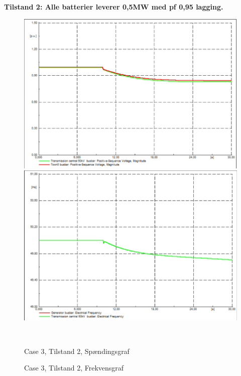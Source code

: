 \textbf{Tilstand 2: Alle batterier leverer 0,5MW med pf 0,95 lagging.}
\begin{figure}[H]
	\centering
	\begin{minipage}[b]{0.48\textwidth}
		\centering
		\includegraphics[width=1.00\textwidth]{figurer/LargeDisturbance/Voltage2} %
	\end{minipage}
	\hfill
	\begin{minipage}[b]{0.48\textwidth}
		\centering
		\includegraphics[width=1.00\textwidth]{figurer/LargeDisturbance/Freq2} %
	\end{minipage}
	\\ %
	\begin{minipage}[t]{0.48\textwidth}
		\caption{Case 3, Tilstand 2, Spændingsgraf} %
		\label{fig:C3T2V}
	\end{minipage}
	\hfill
	\begin{minipage}[t]{0.48\textwidth}
		\caption{Case 3, Tilstand 2, Frekvensgraf} %
		\label{fig:C3T2F}
	\end{minipage}
\end{figure}

